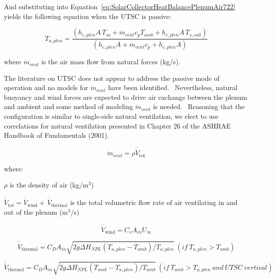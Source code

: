 And substituting into Equation~\ref{eq:SolarCollectorHeatBalancePlenumAir722} yields the following equation when the UTSC is passive:

\begin{equation}
{T_{a,plen}} = \frac{{\left( {{h_{c,plen}}A\,{T_{so}} + {{\dot m}_{vent}}{c_p}{T_{amb}} + {h_{c,plen}}A\,{T_{s,coll}}} \right)}}{{\left( {{h_{c,plen}}A + {{\dot m}_{vent}}{c_p} + {h_{c,plen}}A} \right)}}
\end{equation}

where \({\dot m_{vent}}\) is the air mass flow from natural forces (kg/s).

The literature on UTSC does not appear to address the passive mode of operation and no models for \({\dot m_{vent}}\) have been identified.~ Nevertheless, natural buoyancy and wind forces are expected to drive air exchange between the plenum and ambient and some method of modeling \({\dot m_{vent}}\) is needed.~ Reasoning that the configuration is similar to single-side natural ventilation, we elect to use correlations for natural ventilation presented in Chapter 26 of the ASHRAE Handbook of Fundamentals (2001).

\begin{equation}
{\dot m_{vent}} = \rho {{\overline{\dot V}}_{{\mathrm{tot}}}}
\end{equation}

where:

\(\rho\) is the density of air (kg/m\(^{3}\))

\({{\overline{\dot V}}_{{\mathrm{tot}}}} = {{\overline{\dot V}}_{{\mathrm{wind}}}} + \,{{\overline{\dot V}}_{{\mathrm{thermal}}}}\) is the total volumetric flow rate of air ventilating in and out of the plenum (m\(^{3}\)/s)

\begin{equation}
{{\overline{\dot V}}_{{\mathrm{wind}}}} = {C_v}{A_{in}}{U_\infty }
\end{equation}

\begin{equation}
{{\overline{\dot V}}_{{\mathrm{thermal}}}} = {C_D}{A_{in}}\sqrt {2g\Delta {H_{NPL}}\left( {{T_{a,plen}} - {T_{amb}}} \right)/{T_{a,plen}}} ~ (if~{T_{a,plen}} > {T_{amb}} )
\end{equation}

\begin{equation}
{{\overline{\dot V}}_{{\mathrm{thermal}}}} = {C_D}{A_{in}}\sqrt {2g\Delta {H_{NPL}}\left( {{T_{amb}} - {T_{a,plen}}} \right)/{T_{amb}}} ~ (if~{T_{amb}} > {T_{a,plen}} ~ and~UTSC~vertical)
\end{equation}

